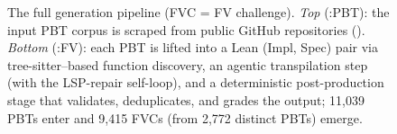 \begin{figure}[t]
\caption{The full \FVSpec generation pipeline (FVC = FV challenge). \emph{Top} (\FVSpec:PBT):
the input PBT corpus is scraped from public GitHub repositories
(). \emph{Bottom} (\FVSpec:FV): each PBT is lifted into a
Lean (Impl, Spec) pair via tree-sitter--based function discovery, an
agentic transpilation step (with the LSP-repair self-loop), and a
deterministic post-production stage that validates, deduplicates, and
grades the output; 11{,}039 PBTs enter and 9{,}415 FVCs (from 2{,}772 distinct PBTs) emerge.}
\label{fig:pipeline}
\end{figure}
